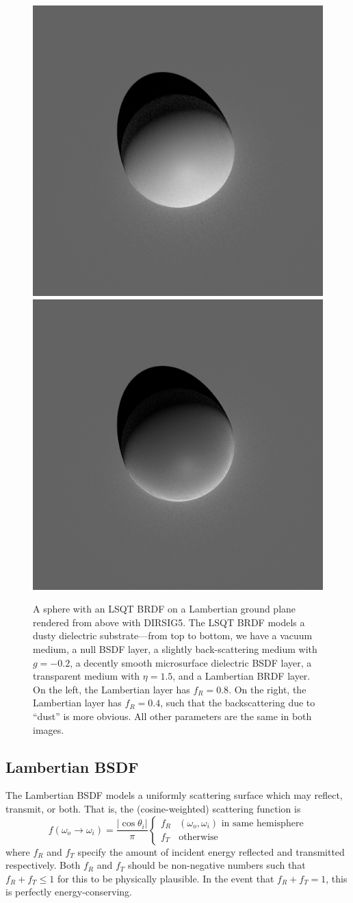 \documentclass[
    twoside,
    twocolumn,
    letterpaper,
    10pt]{article}
\begin{document}
\begin{figure}
\begin{center}
    \includegraphics[width=0.4\linewidth]{example1.png}\hspace{0.05\linewidth}%
    \includegraphics[width=0.4\linewidth]{example2.png}
    \caption{A sphere with an LSQT BRDF on a Lambertian ground plane 
        rendered from above with DIRSIG5. The LSQT BRDF models a
        dusty dielectric substrate---from top to bottom, we have a 
        vacuum medium, a null BSDF layer, a slightly back-scattering 
        medium with $g=-0.2$, a decently smooth microsurface dielectric 
        BSDF layer, a transparent medium with $\eta=1.5$, 
        and a Lambertian BRDF layer. On the left, the Lambertian
        layer has $f_R=0.8$. On the right, the Lambertian layer has 
        $f_R=0.4$, such that the backscattering due to ``dust'' is
        more obvious. All other parameters are the same in both images.}
\end{center}
\end{figure}

\subsection{Lambertian BSDF}

The Lambertian BSDF models a uniformly scattering surface which 
may reflect, transmit, or both. That is, the (cosine-weighted)
scattering function is
\begin{equation*}
    f(\omega_o\to\omega_i) =
    \frac{|\cos{\theta_i}|}{\pi}
    \begin{cases}
        f_R & \text{$(\omega_o, \omega_i)$ in same hemisphere}\\
        f_T & \text{otherwise}
    \end{cases}
\end{equation*}
where $f_R$ and $f_T$ specify the amount of incident energy 
reflected and transmitted respectively. Both $f_R$ and $f_T$ should
be non-negative numbers such that $f_R + f_T \le 1$ for this to be
physically plausible. In the event that $f_R + f_T = 1$, this is
perfectly energy-conserving.
\end{document}
